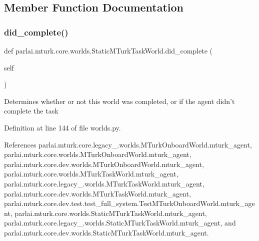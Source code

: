 \subsection{Member Function Documentation}
\mbox{\label{classparlai_1_1mturk_1_1core_1_1worlds_1_1StaticMTurkTaskWorld_a2711944f83104bc843ff81293674c6ab}} 
\subsubsection{\texorpdfstring{did\+\_\+complete()}{did\_complete()}}
{\footnotesize\ttfamily def parlai.\+mturk.\+core.\+worlds.\+Static\+M\+Turk\+Task\+World.\+did\+\_\+complete (\begin{DoxyParamCaption}\item[{}]{self }\end{DoxyParamCaption})}

\begin{DoxyVerb}Determines whether or not this world was completed, or if the agent
didn't complete the task\end{DoxyVerb}
 

Definition at line 144 of file worlds.\+py.



References parlai.\+mturk.\+core.\+legacy\+\_.\+worlds.\+M\+Turk\+Onboard\+World.\+mturk\+\_\+agent, parlai.\+mturk.\+core.\+worlds.\+M\+Turk\+Onboard\+World.\+mturk\+\_\+agent, parlai.\+mturk.\+core.\+dev.\+worlds.\+M\+Turk\+Onboard\+World.\+mturk\+\_\+agent, parlai.\+mturk.\+core.\+worlds.\+M\+Turk\+Task\+World.\+mturk\+\_\+agent, parlai.\+mturk.\+core.\+legacy\+\_.\+worlds.\+M\+Turk\+Task\+World.\+mturk\+\_\+agent, parlai.\+mturk.\+core.\+dev.\+worlds.\+M\+Turk\+Task\+World.\+mturk\+\_\+agent, parlai.\+mturk.\+core.\+dev.\+test.\+test\+\_\+full\+\_\+system.\+Test\+M\+Turk\+Onboard\+World.\+mturk\+\_\+agent, parlai.\+mturk.\+core.\+worlds.\+Static\+M\+Turk\+Task\+World.\+mturk\+\_\+agent, parlai.\+mturk.\+core.\+legacy\+\_.\+worlds.\+Static\+M\+Turk\+Task\+World.\+mturk\+\_\+agent, and parlai.\+mturk.\+core.\+dev.\+worlds.\+Static\+M\+Turk\+Task\+World.\+mturk\+\_\+agent.

